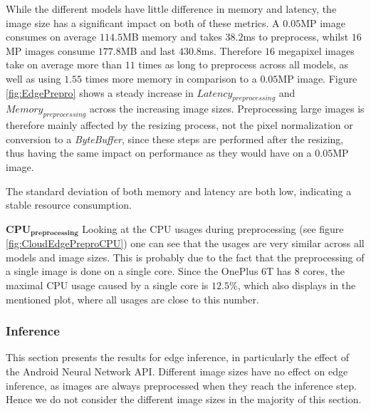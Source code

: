 While the different models have little difference in memory and latency, the image size has a significant impact on both of these metrics.
A $0.05$MP image consumes on average $114.5$MB memory and takes $38.2$ms to preprocess, whilst  $16$MP images consume $177.8$MB and last $430.8$ms.
Therefore $16$ megapixel images take on average more than $11$ times as long to preprocess across all models, as well as using $1.55$ times more memory in comparison to a $0.05$MP image.
Figure \ref{fig:EdgePrepro} shows a steady increase in $Latency_{preprocessing}$ and $Memory_{preprocessing}$ across the increasing image sizes.
Preprocessing large images is therefore mainly affected by the resizing process, not the pixel normalization or conversion to a \emph{ByteBuffer}, since these steps are performed after the resizing, thus having the same impact on performance as they would have on a $0.05$MP image.

The standard deviation of both memory and latency are both low, indicating a stable resource consumption.




$\mathbf{CPU_{preprocessing}}$
Looking at the CPU usages during preprocessing (see figure \ref{fig:CloudEdgePreproCPU}) one can see that the usages are very similar across all models and image sizes. This is probably due to the fact that the preprocessing of a single image is done on a single core. Since the OnePlus 6T has $8$ cores, the maximal CPU usage caused by a single core is $12.5\%$, which also displays in the mentioned plot, where all usages are close to this number.

\FloatBarrier
\subsubsection{Inference}
This section presents the results for edge inference, in particularly the effect of the Android Neural Network API.
Different image sizes have no effect on edge inference, as images are always preprocessed when they reach the inference step.
Hence we do not consider the different image sizes in the majority of this section.


